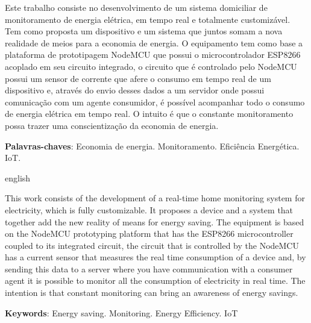 \setlength{\absparsep}{18pt} %
\begin{resumo}

Este trabalho consiste no desenvolvimento de um sistema domiciliar de monitoramento de energia elétrica, em tempo real e totalmente customizável.
Tem como proposta um dispositivo e um sistema que juntos somam a nova realidade de meios para a economia de energia.
O equipamento tem como base a plataforma de prototipagem NodeMCU que possui o microcontrolador ESP8266 acoplado em seu circuito integrado,
o circuito que é controlado pelo NodeMCU possui um sensor de corrente que afere o consumo em tempo real de um dispositivo e, através
do envio desses dados a um servidor onde possui comunicação com um agente consumidor, é possível acompanhar todo o consumo de energia elétrica em tempo real.
O intuito é que o constante monitoramento possa trazer uma conscientização da economia de energia.
 
 \noindent
 \textbf{Palavras-chaves}: Economia de energia. Monitoramento. Eficiência Energética. IoT. 
\end{resumo}
\begin{resumo}[Abstract]
	\begin{otherlanguage*}{english}	
	
	This work consists of the development of a real-time home monitoring system for electricity, which is fully customizable. It proposes a device and a system that together add the new reality of means for energy saving. The equipment is based on the NodeMCU prototyping platform that has the ESP8266 microcontroller coupled to its integrated circuit, the circuit that is controlled by the NodeMCU has a current sensor that measures the real time consumption of a device and, by sending this data to a server where you have communication with a consumer agent it is possible to monitor all the consumption of electricity in real time. The intention is that constant monitoring can bring an awareness of energy savings.
	
	\vspace{\onelineskip}
	\noindent 
	\textbf{Keywords}: Energy saving. Monitoring. Energy Efficiency. IoT
	\end{otherlanguage*}
\end{resumo}